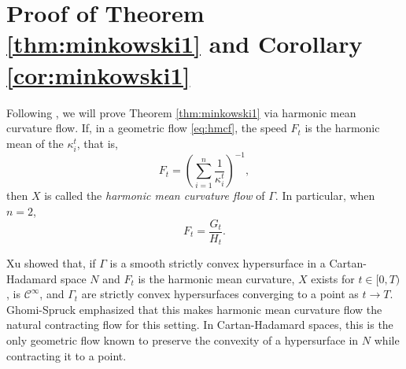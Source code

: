 \documentclass[11pt]{amsart}
\theoremstyle{definition}
\newcommand{\C}{\mathcal{C}}
\theoremstyle{remark}
\numberwithin{equation}{section}
\begin{document}

	
\section{Proof of Theorem \ref{thm:minkowski1} and Corollary \ref{cor:minkowski1}}\label{sec:2}

Following \cite{ghomi-spruck2023}, we will prove Theorem \ref{thm:minkowski1} via harmonic mean curvature flow. If, in a geometric flow \eqref{eq:hmcf}, the speed \(F_t\) is the harmonic mean of the \(\kappa_i^t\), that is,
$$
F_t=\left(\sum_{i=1}^{n}\frac{1}{\kappa_i^t}\right)^{-1},
$$
then $X$ is called the \emph{harmonic mean curvature flow} of $\Gamma$. In particular, when $n=2$,
$$
F_t=\frac{G_t}{H_t}.
$$

Xu showed \cite[Thm. 1.2]{xu2010, gulliver-xu2009} that, if $\Gamma$ is a smooth strictly convex hypersurface in a Cartan-Hadamard space $N$ and $F_t$ is the harmonic mean curvature, $X$ exists for $t\in [0,T)$, is $\C^\infty$, and $\Gamma_t$ are strictly convex hypersurfaces converging to a point as $t\to T$. Ghomi-Spruck \cite{ghomi-spruck2023} emphasized that this makes harmonic mean curvature flow the natural contracting flow for this setting. In Cartan-Hadamard spaces, this is the only geometric flow known to preserve the convexity of a hypersurface in $N$ while contracting it to a point. 
\end{document}
